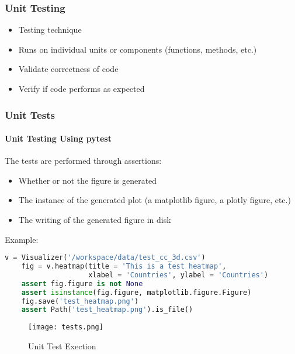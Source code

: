 \begin{frame}
  \frametitle{Unit Testing}

  \begin{itemize}
    \item Testing technique
    \item Runs on individual units or components (functions, methods, etc.)
    \item Validate correctness of code
    \item Verify if code performs as expected
\end{itemize}

\end{frame}



\begin{frame}[fragile,shrink=30]
  \frametitle{Unit Tests}
  \framesubtitle{Unit Testing Using pytest}
  

  The tests are performed through assertions:
  \begin{itemize}
    \item Whether or not the figure is generated
    \item The instance of the generated plot (a matplotlib figure, a plotly figure, etc.) 
    \item The writing of the generated figure in disk
  \end{itemize}

  \vspace{5mm}

  Example:
  \begin{lstlisting}[language=Python]
    v = Visualizer('/workspace/data/test_cc_3d.csv')
    fig = v.heatmap(title = 'This is a test heatmap',
                    xlabel = 'Countries', ylabel = 'Countries')
    assert fig.figure is not None
    assert isinstance(fig.figure, matplotlib.figure.Figure)
    fig.save('test_heatmap.png')
    assert Path('test_heatmap.png').is_file()
  \end{lstlisting}

  \begin{figure}[h]
    \centering
    \texttt{[image: tests.png]}
    \caption{Unit Test Exection}
    \label{fig:tests}
  \end{figure}
  

\end{frame}
